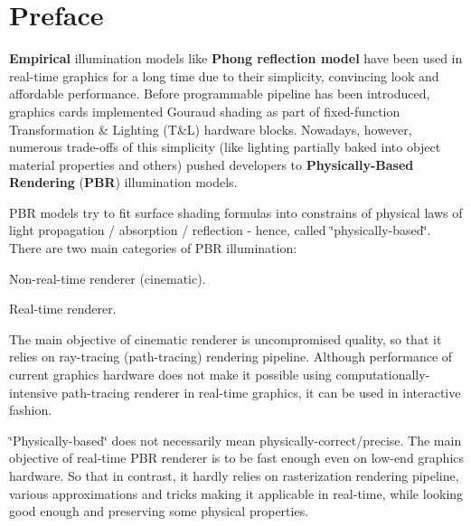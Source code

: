 \hypertarget{specification__pbr_math_pbr_preface}{}\section{Preface}\label{specification__pbr_math_pbr_preface}
{\bfseries Empirical} illumination models like {\bfseries Phong reflection model} have been used in real-\/time graphics for a long time due to their simplicity, convincing look and affordable performance. Before programmable pipeline has been introduced, graphics cards implemented Gouraud shading as part of fixed-\/function Transformation \& Lighting (T\&L) hardware blocks. Nowadays, however, numerous trade-\/offs of this simplicity (like lighting partially baked into object material properties and others) pushed developers to {\bfseries Physically-\/\+Based Rendering} ({\bfseries P\+BR}) illumination models.

P\+BR models try to fit surface shading formulas into constrains of physical laws of light propagation / absorption / reflection -\/ hence, called \char`\"{}physically-\/based\char`\"{}. There are two main categories of P\+BR illumination\+:


\begin{DoxyEnumerate}
\item Non-\/real-\/time renderer (cinematic).
\item Real-\/time renderer.
\end{DoxyEnumerate}

The main objective of cinematic renderer is uncompromised quality, so that it relies on ray-\/tracing (path-\/tracing) rendering pipeline. Although performance of current graphics hardware does not make it possible using computationally-\/intensive path-\/tracing renderer in real-\/time graphics, it can be used in interactive fashion.

\char`\"{}\+Physically-\/based\char`\"{} does not necessarily mean physically-\/correct/precise. The main objective of real-\/time P\+BR renderer is to be fast enough even on low-\/end graphics hardware. So that in contrast, it hardly relies on rasterization rendering pipeline, various approximations and tricks making it applicable in real-\/time, while looking good enough and preserving some physical properties.

